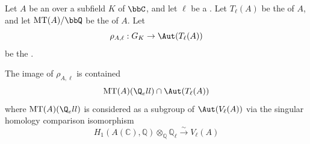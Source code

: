 \begin{lemma} \label{lemma:image_of_integral_ell_adic_representation_of_abelian_variety_over_a_subfield_of_complex_numbers_is_contained_in_the_integral_ell_adic_points_of_mumford_tate_group}
    Let $A$ be an  over a subfield $K$ of $\bbC$, and let $\ell$ be a . Let $T_\ell(A)$ be the  of $A$, and let $\mathrm{MT}(A)/\bbQ$ be the  of $A$. Let
    $$\rho_{A,\ell}: G_K \to \Aut(T_\ell(A))$$
    be the . 

    The image of $\rho_{A,\ell}$ is contained $$\mathrm{MT}(A)(\Q_ell) \cap \Aut(T_\ell(A))$$
    where $\mathrm{MT}(A)(\Q_ell)$ is considered as a subgroup of $\Aut(V_\ell(A))$ via the singular homology comparison isomorphism
    $$H_1(A(\mathbb{C}), \mathbb{Q}) \otimes_\mathbb{Q} \mathbb{Q}_\ell \xrightarrow{\sim} V_\ell(A)$$
\end{lemma}